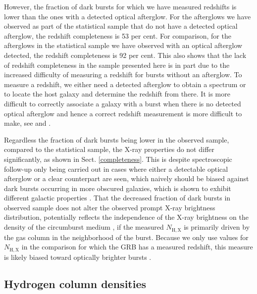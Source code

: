 \documentclass[longauth]{aa}    %
\begin{document}
However, the fraction of dark bursts for which we have measured redshifts is
lower than the ones with a detected optical afterglow. For the afterglows we
have observed as part of the statistical sample that do not have a detected
optical afterglow, the redshift completeness is 53 per cent. For comparison, for
the afterglows in the statistical sample we have observed with an optical
afterglow detected, the redshift completeness is 92 per cent. This also shows
that the lack of redshift completeness in the sample presented here is in part
due to the increased difficulty of measuring a redshift for bursts without an
afterglow. To measure a redshift, we either need a detected afterglow to obtain
a spectrum or to locate the host galaxy and determine the redshift from there.
It is more difficult to correctly associate a galaxy with a burst when there is
no detected optical afterglow and hence a correct redshift measurement is more
difficult to make, see \citet{Jakobsson2005, Levesque2010} and
\citet{Perley2017}.

Regardless the fraction of dark bursts being lower in the observed sample,
compared to the statistical sample, the X-ray properties do not differ
significantly, as shown in Sect. \ref{completeness}. This is despite
spectroscopic follow-up only being carried out in cases where either a
detectable optical afterglow or a clear counterpart are seen, which naively
should be biased against dark bursts occurring in more obscured galaxies, which
is shown to exhibit different galactic properties \citep{Perley2009,
	Kruhler2011, Rossi2012, Perley2013b, Perley2015b}. That the decreased fraction
of dark bursts in observed sample does not alter the observed prompt X-ray
brightness distribution, potentially reflects the independence of the X-ray
brightness on the density of the circumburst medium \citep{Freedman2001,
	Berger2003, Nysewander2009}, if the measured $N_{\mathrm{H, X}}$ is primarily
driven by the gas column in the neighborhood of the burst. Because we only use
values for $N_{\mathrm{H, X}}$ in the comparison for which the GRB has a
measured redshift, this measure is likely biased toward optically brighter
bursts \citep[e.g.][]{Watson2012}.

 \subsection{Hydrogen column densities}
\end{document}
